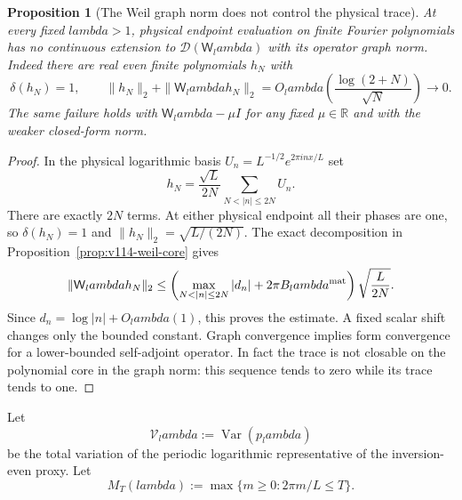 \documentclass[11pt]{article}
\def\lambda{lambda}%
\newtheorem{proposition}[theorem]{Proposition}
\theoremstyle{remark}
\begin{document}
\begin{proposition}[The Weil graph norm does not control the physical trace]
\label{prop:v118-graph-trace}
At every fixed $\lambda>1$, physical endpoint evaluation on finite
Fourier polynomials has no continuous extension to
$\mathcal D(\mathsf W_\lambda)$ with its operator graph norm.
Indeed there are real even finite polynomials $h_N$ with
\[
 \delta(h_N)=1,\qquad
 \|h_N\|_2+\|\mathsf W_\lambda h_N\|_2
       =O_\lambda\!\left(\frac{\log(2+N)}{\sqrt N}\right)\longrightarrow0.
\]
The same failure holds with $\mathsf W_\lambda-\mu I$ for any fixed
$\mu\in\mathbb R$ and with the weaker closed-form norm.
\end{proposition}
\begin{proof}
In the physical logarithmic basis $U_n=L^{-1/2}e^{2\pi inx/L}$ set
\[
 h_N=\frac{\sqrt L}{2N}\sum_{N<|n|\le2N}U_n.
\]
There are exactly $2N$ terms. At either physical endpoint all their
phases are one, so $\delta(h_N)=1$ and
$\|h_N\|_2=\sqrt{L/(2N)}$. The exact decomposition in
Proposition~\ref{prop:v114-weil-core} gives
\[
 \|\mathsf W_\lambda h_N\|_2
 \le\left(\max_{N<|n|\le2N}|d_n|
              +2\pi B_\lambda^{\rm mat}\right)\sqrt{\frac L{2N}}.
\]
Since $d_n=\log|n|+O_\lambda(1)$, this proves the estimate.
A fixed scalar shift changes only the bounded constant. Graph convergence
implies form convergence for a lower-bounded self-adjoint operator.
In fact the trace is not closable on the polynomial core in the graph
norm: this sequence tends to zero while its trace tends to one.
\end{proof}

Let
\[
 \mathcal V_\lambda:=\operatorname{Var}(p_\lambda)
\]
be the total variation of the periodic logarithmic representative of the
inversion-even proxy.  Let
\[
 M_T(\lambda):=\max\{m\ge0:2\pi m/L\le T\}.
\]
\end{document}
